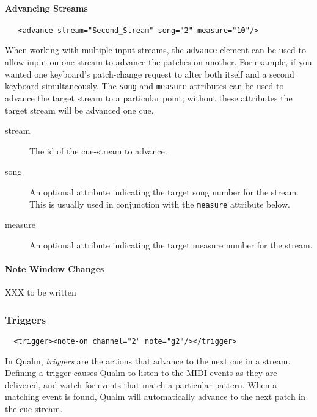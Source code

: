 \documentclass{article}
\makeatletter
\newcommand{\q}{{\textsf{Qualm}}\xspace}
\newcommand{\elt}[1]{{\index{#1@\texttt{#1} element}\texttt{#1} element}}
\makeatother
\begin{document}
\paragraph{Advancing Streams}
\label{par:advancing-streams}

\begin{verbatim}
   <advance stream="Second_Stream" song="2" measure="10"/>
\end{verbatim}

 When working with multiple input streams,
the \elt{advance} can be used to allow input on one stream to advance
the patches on another.  For example, if you wanted one keyboard's
patch-change request to alter both itself and a second keyboard
simultaneously.  The {\tt song} and {\tt measure} attributes can be used
to advance the target stream to a particular point; without these
attributes the target stream will be advanced one cue.

\begin{description}
\item[stream] The id of the cue-stream to advance.

\item[song] An optional attribute indicating the target song number
  for the stream.  This is usually used in conjunction with the
  {\tt measure} attribute below.

\item[measure] An optional attribute indicating the target measure
  number for the stream.
\end{description}

\paragraph{Note Window Changes}

XXX to be written

\subsubsection{Triggers}

\begin{verbatim}
  <trigger><note-on channel="2" note="g2"/></trigger>
\end{verbatim}

In \q, {\em triggers} are the actions that advance to the next cue in
a stream.  Defining a trigger causes \q to listen to the MIDI events
as they are delivered, and watch for events that match a particular
pattern.  When a matching event is found, \q will automatically
advance to the next patch in the cue stream.
\end{document}

